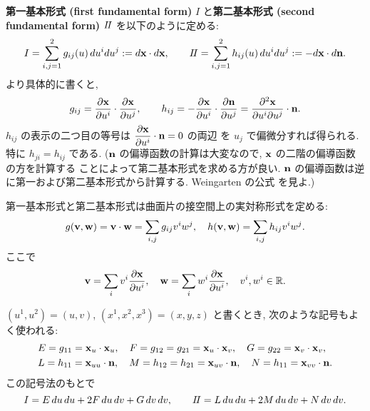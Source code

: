 \documentclass[12pt,twoside]{jarticle}
\begin{document}
\begin{definition}
 {\bf 第一基本形式 (first fundamental form)} $I$ 
 と{\bf 第二基本形式 (second fundamental form)} $I\!I$ を以下のように定める:
  \[
    I  = \sum_{i,j=1}^2 g_{ij}(u) \, du^i du^j
    := d{\mathbf x} \cdot d{\mathbf x},
    \qquad
    I\!I = \sum_{i,j=1}^2 h_{ij}(u) \, du^i du^j
    := - d{\mathbf x} \cdot d{\mathbf n}.
  \]
  より具体的に書くと, 
  \[
    g_{ij} 
    = \dfrac{\partial{\mathbf x}}{\partial u^i} \cdot \dfrac{\partial{\mathbf x}}{\partial u^j},
    \qquad
    h_{ij}
    = - \dfrac{\partial{\mathbf x}}{\partial u^i} \cdot \dfrac{\partial{\mathbf n}}{\partial u^j}
    = \dfrac{\partial^2{\mathbf x}}{\partial u^i\partial u^j} \cdot {\mathbf n}.
  \]
  $h_{ij}$ の表示の二つ目の等号は $\dfrac{\partial{\mathbf x}}{\partial u^i}\cdot{\mathbf n}=0$ の両辺
  を $u_j$ で偏微分すれば得られる. 特に $h_{ji}=h_{ij}$ である.
  (${\mathbf n}$ の偏導函数の計算は大変なので, ${\mathbf x}$ の二階の偏導函数の方を計算する
  ことによって第二基本形式を求める方が良い. 
  ${\mathbf n}$ の偏導函数は逆に第一および第二基本形式から計算する.
  Weingarten の公式  を見よ.)

  第一基本形式と第二基本形式は曲面片の接空間上の実対称形式を定める:
  \begin{align*}
   g({\mathbf v},{\mathbf w}) = {\mathbf v}\cdot{\mathbf w} = \sum_{i,j} g_{ij} v^i w^j,
   \quad
   h({\mathbf v},{\mathbf w}) = \sum_{i,j} h_{ij} v^iw^j.
  \end{align*}
  ここで
  \begin{equation*}
   {\mathbf v} = \sum_i v^i \frac{\partial {\mathbf x}}{\partial u^i},
    \quad
    {\mathbf w} = \sum_i w^i \frac{\partial {\mathbf x}}{\partial u^i},
    \quad
    v^i,w^i\in{\mathbb R}.
  \end{equation*}

  $(u^1,u^2)=(u,v)$, $(x^1,x^2,x^3)=(x,y,z)$ と書くとき, 
  次のような記号もよく使われる:
  \begin{align*}
   &
   E = g_{11} = {\mathbf x}_u\cdot{\mathbf x}_u, \quad
   F = g_{12} = g_{21} = {\mathbf x}_u\cdot{\mathbf x}_v, \quad
   G = g_{22} = {\mathbf x}_v\cdot{\mathbf x}_v,
   \\ &
   L = h_{11} = {\mathbf x}_{uu}\cdot{\mathbf n}, \quad
   M = h_{12} = h_{21} = {\mathbf x}_{uv}\cdot{\mathbf n}, \quad
   N = h_{11} = {\mathbf x}_{vv}\cdot{\mathbf n}.
  \end{align*}
  この記号法のもとで
  \[
   I = E\,du\,du + 2F\,du\,dv + G\,dv\,dv,
   \qquad
   I\!I = L\,du\,du + 2M\,du\,dv + N\,dv\,dv.
  \]


\end{definition}
\end{document}
